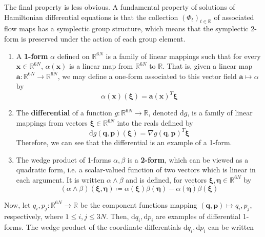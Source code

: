       The final property is less obvious. A fundamental property of solutions of Hamiltonian differential equations is that the collection $(\Phi_t)_{t \in \mathbb{R}}$ of associated flow maps has a symplectic group structure, which means that the symplectic 2-form is preserved under the action of each group element. 
      \begin{enumerate}
        \item A \textbf{1-form} $\alpha$ defined on $\mathbb{R}^{6N}$ is a family of linear mappings such that for every $\mathbf{x} \in \mathbb{R}^{6N}$, $\alpha(\mathbf{x})$ is a linear map from $\mathbb{R}^{6N}$ to $\mathbb{R}$. That is, given a linear map $\mathbf{a}: \mathbb{R}^{6N} \longrightarrow \mathbb{R}^{6N}$, we may define a one-form associated to this vector field $\mathbf{a} \mapsto \alpha$ by 
        \begin{equation}
          \alpha(\mathbf{x}) (\boldsymbol{\xi}) = \mathbf{a} (\mathbf{x})^T \boldsymbol{\xi}
        \end{equation}
        \item The \textbf{differential} of a function $g: \mathbb{R}^{6N} \longrightarrow \mathbb{R}$, denoted $\mathrm{d}g$, is a family of linear mappings from vectors $\boldsymbol{\xi} \in \mathbb{R}^{6N}$ into the reals defined by 
        \begin{equation}
          \mathrm{d}g (\mathbf{q}, \mathbf{p}) (\boldsymbol{\xi}) = \nabla g(\mathbf{q}, \mathbf{p})^T \boldsymbol{\xi}
        \end{equation}
        Therefore, we can see that the differential is an example of a 1-form. 
        \item The wedge product of 1-forms $\alpha, \beta$ is a \textbf{2-form}, which can be viewed as a quadratic form, i.e. a scalar-valued function of two vectors which is linear in each argument. It is written $\alpha \wedge \beta$ and is defined, for vectors $\boldsymbol{\xi}, \boldsymbol{\eta} \in \mathbb{R}^{6N}$ by 
        \begin{equation}
          (\alpha \wedge \beta)(\boldsymbol{\xi}, \boldsymbol{\eta}) \coloneqq \alpha(\boldsymbol{\xi}) \beta(\boldsymbol{\eta}) - \alpha(\boldsymbol{\eta}) \beta(\boldsymbol{\xi})
        \end{equation}
      \end{enumerate}
      Now, let $q_i, p_j: \mathbb{R}^{6N} \longrightarrow \mathbb{R}$ be the component functions mapping $(\mathbf{q}, \mathbf{p}) \mapsto q_i, p_j$, respectively, where $1 \leq i, j \leq 3N$. Then, $\mathrm{d} q_i, \mathrm{d} p_i$ are examples of differential 1-forms. The wedge product of the coordinate differentials $\mathrm{d}q_i, \mathrm{d} p_i$ can be written
